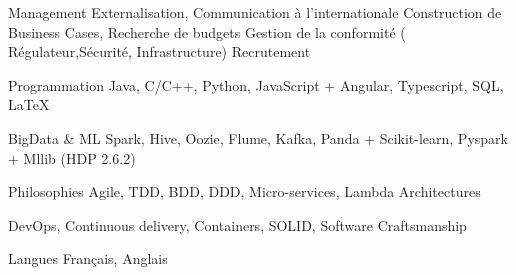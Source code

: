 


\begin{cvskills}


\cvskill
{\scriptsize Management} %
{\scriptsize {\enskip\cdotp\enskip}Externalisation, Communication à l'internationale}
\cvskill
{} 
{\scriptsize {\enskip\cdotp\enskip}Construction de Business Cases, Recherche de budgets }
\cvskill
{} 
{\scriptsize {\enskip\cdotp\enskip}Gestion de la conformité ( Régulateur,Sécurité, Infrastructure) } %
\cvskill
{} 
{\scriptsize {\enskip\cdotp\enskip}Recrutement } %

\cvskill
{\scriptsize Programmation} %
{\scriptsize Java, C/C++, Python, JavaScript + Angular, Typescript, SQL, LaTeX} %

\cvskill
{\scriptsize BigData \& ML} %
{\scriptsize Spark, Hive, Oozie, Flume, Kafka, Panda + Scikit-learn, Pyspark + Mllib (HDP 2.6.2) } %

\cvskill
{\scriptsize Philosophies} %
{\scriptsize Agile, TDD, BDD, DDD, Micro-services, Lambda Architectures} %

\cvskill
{} %
{\scriptsize DevOps, Continuous delivery, Containers, SOLID, Software Craftsmanship} %


\cvskill
{\scriptsize Langues} %
{\scriptsize Français, Anglais} %

\end{cvskills}